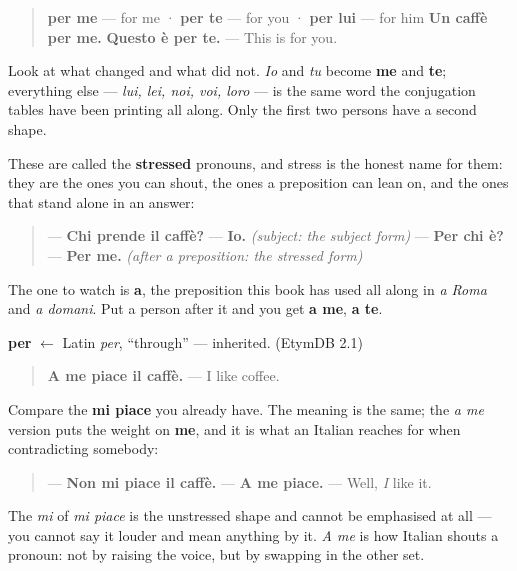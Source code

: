 \begin{quote}
\textbf{per me} — for me · \textbf{per te} — for you · \textbf{per lui} — for him \textbf{Un caffè per me.} \textbf{Questo è per te.} — This is for you.
\end{quote}

Look at what changed and what did not. \emph{Io} and \emph{tu} become \textbf{me} and \textbf{te}; everything else — \emph{lui, lei, noi, voi, loro} — is the same word the conjugation tables have been printing all along. Only the first two persons have a second shape.

These are called the \textbf{stressed} pronouns, and stress is the honest name for them: they are the ones you can shout, the ones a preposition can lean on, and the ones that stand alone in an answer:

\begin{quote}
— \textbf{Chi prende il caffè?} — \textbf{Io.} \emph{(subject: the subject form)} — \textbf{Per chi è?} — \textbf{Per me.} \emph{(after a preposition: the stressed form)}
\end{quote}

The one to watch is \textbf{a}, the preposition this book has used all along in \emph{a Roma} and \emph{a domani}. Put a person after it and you get \textbf{a me}, \textbf{a te}.

\begin{cousinweb}
\textbf{per} $\leftarrow$ Latin \emph{per}, \textquotedblleft{}through\textquotedblright{} — inherited. (EtymDB 2.1)
\end{cousinweb}

\begin{grammarlens}[title={Grammar lens: a me piace, and where the weight falls}]
\begin{quote}
\textbf{A me piace il caffè.} — I like coffee.
\end{quote}

Compare the \textbf{mi piace} you already have. The meaning is the same; the \emph{a me} version puts the weight on \textbf{me}, and it is what an Italian reaches for when contradicting somebody:

\begin{quote}
— \textbf{Non mi piace il caffè.} — \textbf{A me piace.} — Well, \emph{I} like it.
\end{quote}

The \emph{mi} of \emph{mi piace} is the unstressed shape and cannot be emphasised at all — you cannot say it louder and mean anything by it. \emph{A me} is how Italian shouts a pronoun: not by raising the voice, but by swapping in the other set.
\end{grammarlens}

